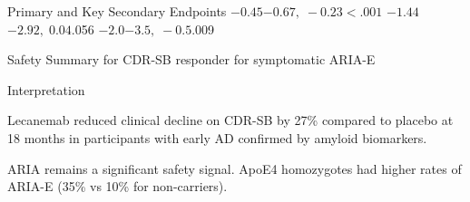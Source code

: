 \documentclass[palette=clinical]{rossbeamerclinical}
\begin{document}
\begin{frame}{Primary and Key Secondary Endpoints}
    {$-0.45$}{$-0.67,\;-0.23$}{$< .001$}
  \vskip6pt
    {$-1.44$}{$-2.92,\;0.04$}{.056}
  \vskip6pt
    {$-2.0$}{$-3.5,\;-0.5$}{.009}
\end{frame}

\begin{frame}{Safety Summary}
  \vskip4pt
  \vskip4pt
  \vskip4pt
  \vskip6pt
   for CDR-SB responder\qquad {} for symptomatic ARIA-E
\end{frame}

\begin{frame}{Interpretation}
  \begin{findingbox}
    Lecanemab reduced clinical decline on CDR-SB by 27\% compared to
    placebo at 18 months in participants with early AD confirmed by
    amyloid biomarkers.
  \end{findingbox}
  \vskip6pt
  \begin{limitationbox}
    ARIA remains a significant safety signal. ApoE4 homozygotes had
    higher rates of ARIA-E (35\% vs 10\% for non-carriers).
  \end{limitationbox}
\end{frame}

\end{document}
